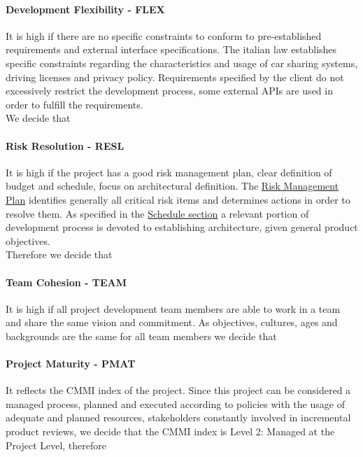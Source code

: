 \paragraph{Development Flexibility - FLEX} It is high if there are no specific constraints to conform to pre-established requirements and external interface specifications. The italian law establishes specific constraints regarding the characteristics and usage of car sharing systems, driving licenses and privacy policy. Requirements specified by the client do not excessively restrict the development process, some external APIs are used in order to fulfill the requirements.\\We decide that

\paragraph{Risk Resolution - RESL} It is high if the project has a good risk management plan, clear definition of budget and schedule, focus on architectural definition. The \hyperref[sec:riskManagement]{Risk Management Plan} identifies generally all critical risk items and determines actions in order to resolve them. As specified in the \hyperref[sec:schedule]{Schedule section} a relevant portion of development process is devoted to establishing architecture, given general product objectives.\\Therefore we decide that

\paragraph{Team Cohesion - TEAM} It is high if all project development team members are able to work in a team and share the same vision and commitment. As objectives, cultures, ages and backgrounds are the same for all team members we decide that

\paragraph{Project Maturity - PMAT} It reflects the CMMI index of the project. Since this project can be considered a managed process, planned and executed according to policies with the usage of adequate and planned resources, stakeholders constantly involved in incremental product reviews, we decide that the CMMI index is Level 2: Managed at the Project Level, therefore

